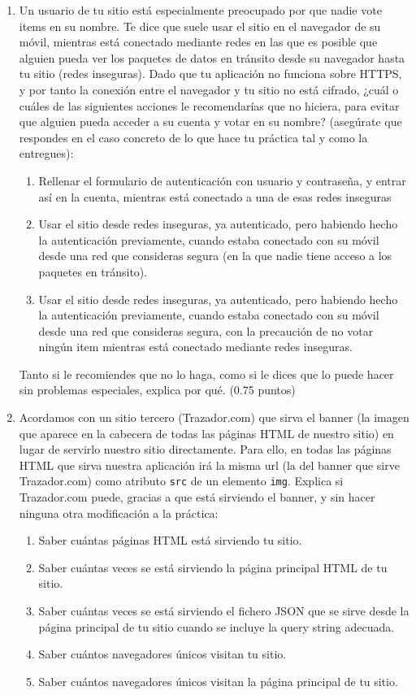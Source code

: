 \begin{enumerate}
\item Un usuario de tu sitio está especialmente preocupado por que nadie vote items en su nombre. Te dice que suele usar el sitio en el navegador de su móvil, mientras está conectado mediante redes en las que es posible que alguien pueda ver los paquetes de datos en tránsito desde su navegador hasta tu sitio (redes inseguras). Dado que tu aplicación no funciona sobre HTTPS, y por tanto la conexión entre el navegador y tu sitio no está cifrado, ¿cuál o cuáles de las siguientes acciones le recomendarías que no hiciera, para evitar que alguien pueda acceder a su cuenta y votar en su nombre? (asegúrate que respondes en el caso concreto de lo que hace tu práctica tal y como la entregues):

  \begin{enumerate}
  \item Rellenar el formulario de autenticación con usuario y contraseña, y entrar así en la cuenta, mientras está conectado a una de esas redes inseguras
  \item Usar el sitio desde redes inseguras, ya autenticado, pero habiendo hecho la autenticación previamente, cuando estaba conectado con su móvil desde una red que consideras segura (en la que nadie tiene acceso a los paquetes en tránsito).
  \item Usar el sitio desde redes inseguras, ya autenticado, pero habiendo hecho la autenticación previamente, cuando estaba conectado con su móvil desde una red que consideras segura, con la precaución de no votar ningún item mientras está conectado mediante redes inseguras.
  \end{enumerate}

Tanto si le recomiendes que no lo haga, como si le dices que lo puede hacer sin problemas especiales, explica por qué. (0.75 puntos)
  
\item Acordamos con un sitio tercero (Trazador.com) que sirva el banner (la imagen que aparece en la cabecera de todas las páginas HTML de nuestro sitio) en lugar de servirlo nuestro sitio directamente. Para ello, en todas las páginas HTML que sirva nuestra aplicación irá la misma url (la del banner que sirve Trazador.com) como atributo \verb|src| de un elemento \verb|img|. Explica si Trazador.com puede, gracias a que está sirviendo el banner, y sin hacer ninguna otra modificación a la práctica:
  \begin{enumerate}
  \item Saber cuántas páginas HTML está sirviendo tu sitio.
  \item Saber cuántas veces se está sirviendo la página principal HTML de tu sitio.
  \item Saber cuántas veces se está sirviendo el fichero JSON que se sirve desde la página principal de tu sitio cuando se incluye la query string adecuada.
  \item Saber cuántos navegadores únicos visitan tu sitio.
  \item Saber cuántos navegadores únicos visitan la página principal de tu sitio.
  \end{enumerate}


\end{enumerate}
